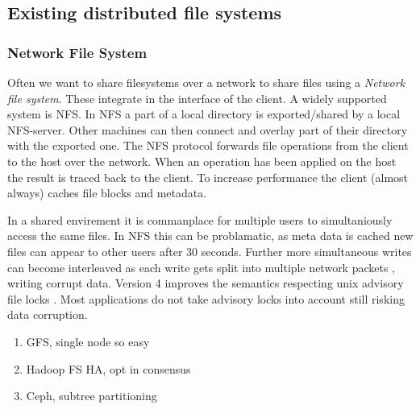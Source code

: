 \subsection{Existing distributed file systems}



\subsubsection{Network File System}
Often we want to share filesystems over a network to share files using a \textit{Network file system}. These integrate in the interface of the client. A widely supported system is \textsc{NFS}. In \textsc{NFS} a part of a local directory is exported/shared by a local \textsc{NFS}-server. Other machines can then connect and overlay part of their directory with the exported one. The NFS protocol forwards file operations from the client to the host over the network. When an operation has been applied on the host the result is traced back to the client. To increase performance the client (almost always) caches file blocks and metadata. 

In a shared envirement it is commanplace for multiple users to simultaniously access the same files. In \textsc{NFS} this can be problamatic, as meta data is cached new files can appear to other users after 30 seconds. Further more simultaneous writes can become interleaved as each write gets split into multiple network packets \cite[p. 527]{os}, writing corrupt data. Version 4 improves the semantics respecting unix advisory file locks \cite{rfc3530}. Most applications do not take advisory locks into account still risking data corruption. 

\begin{enumerate}
	\item GFS, single node so easy
	\item Hadoop FS HA, opt in consensus
	\item Ceph, subtree partitioning
\end{enumerate}

